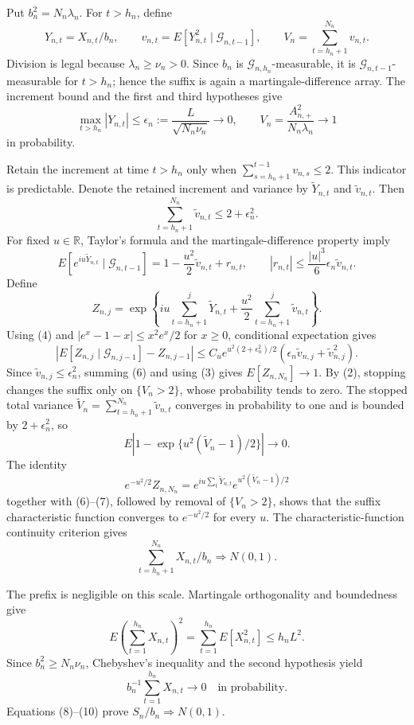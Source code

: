 Put \(b_n^2=N_n\lambda_n\). For \(t>h_n\), define
\[
 Y_{n,t}=X_{n,t}/b_n,\qquad
 v_{n,t}=E[Y_{n,t}^2\mid\mathcal G_{n,t-1}],\qquad
 V_n=\sum_{t=h_n+1}^{N_n}v_{n,t}.
\tag{1}
\]
Division is legal because \(\lambda_n\ge\nu_n>0\). Since \(b_n\) is \(\mathcal G_{n,h_n}\)-measurable, it is \(\mathcal G_{n,t-1}\)-measurable for \(t>h_n\); hence the suffix is again a martingale-difference array. The increment bound and the first and third hypotheses give
\[
 \max_{t>h_n}|Y_{n,t}|
 \le\epsilon_n:=\frac{L}{\sqrt{N_n\nu_n}}\longrightarrow0,
 \qquad V_n=\frac{A_{n,+}^2}{N_n\lambda_n}\longrightarrow1
\tag{2}
\]
in probability.

Retain the increment at time \(t>h_n\) only when \(\sum_{s=h_n+1}^{t-1}v_{n,s}\le2\). This indicator is predictable. Denote the retained increment and variance by \(\widetilde Y_{n,t}\) and \(\widetilde v_{n,t}\). Then
\[
 \sum_{t=h_n+1}^{N_n}\widetilde v_{n,t}\le2+\epsilon_n^2.
\tag{3}
\]
For fixed \(u\in\mathbb R\), Taylor's formula and the martingale-difference property imply
\[
 E[e^{iu\widetilde Y_{n,t}}\mid\mathcal G_{n,t-1}]
 =1-\frac{u^2}{2}\widetilde v_{n,t}+r_{n,t},
 \qquad |r_{n,t}|\le\frac{|u|^3}{6}\epsilon_n\widetilde v_{n,t}.
\tag{4}
\]
Define
\[
 Z_{n,j}=\exp\!\left\{iu\sum_{t=h_n+1}^j\widetilde Y_{n,t}
 +\frac{u^2}{2}\sum_{t=h_n+1}^j\widetilde v_{n,t}\right\}.
\tag{5}
\]
Using (4) and \(|e^x-1-x|\le x^2e^x/2\) for \(x\ge0\), conditional expectation gives
\[
 \left|E[Z_{n,j}\mid\mathcal G_{n,j-1}]-Z_{n,j-1}\right|
 \le C_u e^{u^2(2+\epsilon_n^2)/2}
 \left(\epsilon_n\widetilde v_{n,j}+\widetilde v_{n,j}^2\right).
\tag{6}
\]
Since \(\widetilde v_{n,j}\le\epsilon_n^2\), summing (6) and using (3) gives \(E[Z_{n,N_n}]\to1\). By (2), stopping changes the suffix only on \(\{V_n>2\}\), whose probability tends to zero. The stopped total variance \(\widetilde V_n=\sum_{t=h_n+1}^{N_n}\widetilde v_{n,t}\) converges in probability to one and is bounded by \(2+\epsilon_n^2\), so
\[
 E\left|1-\exp\{u^2(\widetilde V_n-1)/2\}\right|\longrightarrow0.
\tag{7}
\]
The identity
\[
 e^{-u^2/2}Z_{n,N_n}
 =e^{iu\sum_t\widetilde Y_{n,t}}
 e^{u^2(\widetilde V_n-1)/2}
\]
together with (6)--(7), followed by removal of \(\{V_n>2\}\), shows that the suffix characteristic function converges to \(e^{-u^2/2}\) for every \(u\). The characteristic-function continuity criterion gives
\[
 \sum_{t=h_n+1}^{N_n}X_{n,t}/b_n\Rightarrow N(0,1).
\tag{8}
\]

The prefix is negligible on this scale. Martingale orthogonality and boundedness give
\[
 E\left(\sum_{t=1}^{h_n}X_{n,t}\right)^2
 =\sum_{t=1}^{h_n}E[X_{n,t}^2]\le h_nL^2.
\tag{9}
\]
Since \(b_n^2\ge N_n\nu_n\), Chebyshev's inequality and the second hypothesis yield
\[
 b_n^{-1}\sum_{t=1}^{h_n}X_{n,t}\longrightarrow0
 \quad\text{in probability}.
\tag{10}
\]
Equations (8)--(10) prove \(S_n/b_n\Rightarrow N(0,1)\).

